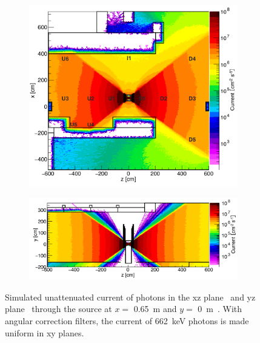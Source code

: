 	\begin{figure}[H]
		\begin{subfigure}{0.5\linewidth}
		    \centering
			\includegraphics[width = .85\linewidth]{fig/chapt5/GIFpp-gCurrent-XZ.png}\\
			\caption{\label{fig:GIFpp-gCurrent:XZ}}
		\end{subfigure}
		\begin{subfigure}{0.5\linewidth}
		    \centering
			\includegraphics[width = .85\linewidth]{fig/chapt5/GIFpp-gCurrent-YZ.png}
			\caption{\label{fig:GIFpp-gCurrent:YZ}}
		\end{subfigure}
		\caption{\label{fig:GIFpp-gCurrent} Simulated unattenuated current of photons in the xz plane~ and yz plane~ through the source at $x=$ \SI{0.65}{m} and $y=$ \SI{0}{m}~\cite{PFEIFFER2017}. With angular correction filters, the current of \SI{662}{keV} photons is made uniform in xy planes.}
    \end{figure}
	
